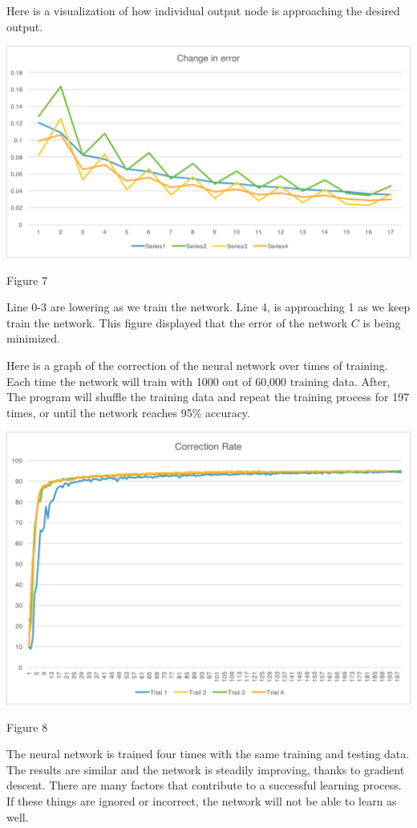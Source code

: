 \documentclass[]{article}
\begin{document}
\begin{multicols}{2}
Here is a visualization of how individual output node is approaching the desired output.

\centerline{\includegraphics[width=1\linewidth]{graph1} }
\centerline{Figure 7}
\vspace{0.5cm}

Line 0-3 are lowering as we train the network. Line 4, is approaching 1 as we keep train the network. This figure displayed that the error of the network \(C\) is being minimized. 

Here is a graph of the correction of the neural network over times of training. Each time the network will train with 1000 out of 60,000 training data. After, The program will shuffle the training data and repeat the training process for 197 times, or until the network reaches 95\% accuracy. 

\centerline{\includegraphics[width=1\linewidth]{graph2}}
\centerline {Figure 8}
\vspace{0.3cm}

The neural network is trained four times with the same training and testing data. The results are similar and the network is steadily improving, thanks to gradient descent. There are many factors that contribute to a successful learning process. If these things are ignored or incorrect, the network will not be able to learn as well. 


\end{multicols}
\end{document}
